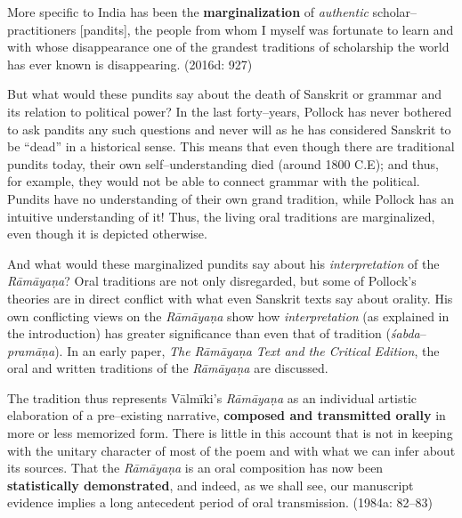 \begin{myquote}
More specific to India has been the \textbf{marginalization} of \textit{authentic} scholar–practitioners [pandits], the people from whom I myself was fortunate to learn and with whose disappearance one of the grandest traditions of scholarship the world has ever known is disappearing. (2016d: 927)
\end{myquote}

But what would these pundits say about the death of Sanskrit or grammar and its relation to political power? In the last forty–years, Pollock has never bothered to ask pandits any such questions and never will as he has considered Sanskrit to be “dead” in a historical sense. This means that even though there are traditional pundits today, their own self–understanding died (around 1800 C.E); and thus, for example, they would not be able to connect grammar with the political. Pundits have no understanding of their own grand tradition, while Pollock has an intuitive understanding of it! Thus, the living oral traditions are marginalized, even though it is depicted otherwise.

And what would these marginalized pundits say about his \textit{interpretation} of the \textit{Rāmāyaṇa}? Oral traditions are not only disregarded, but some of Pollock’s theories are in direct conflict with what even Sanskrit texts say about orality. His own conflicting views on the \textit{Rāmāyaṇa }show how \textit{interpretation }(as explained in the introduction) has greater significance than even that of tradition (\textit{śabda}–\textit{pramāṇa}). In an early paper, \textit{The Rāmāyaṇa Text and the Critical Edition}, the oral and written traditions of the \textit{Rāmāyaṇa} are discussed.

\begin{myquote}
The tradition thus represents Vālmīki’s \textit{Rāmāyaṇa }as an individual artistic elaboration of a pre–existing narrative, \textbf{composed and transmitted orally} in more or less memorized form. There is little in this account that is not in keeping with the unitary character of most of the poem and with what we can infer about its sources. That the \textit{Rāmāyaṇa }is an oral composition has now been \textbf{statistically demonstrated}, and indeed, as we shall see, our manuscript evidence implies a long antecedent period of oral transmission. (1984a: 82–83)
\end{myquote}

